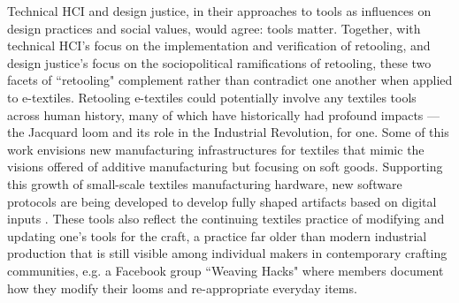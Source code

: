 Technical HCI and design justice, in their approaches to tools as influences on design practices and social values, would agree: tools matter. Together, with technical HCI's focus on the implementation and verification of retooling, and design justice's focus on the sociopolitical ramifications of retooling, these two facets of ``retooling" complement rather than contradict one another when applied to e-textiles. Retooling e-textiles could potentially involve any textiles tools across human history, many of which have historically had profound impacts --- the Jacquard loom and its role in the Industrial Revolution, for one. Some of this work envisions new manufacturing infrastructures for textiles that mimic the visions offered of additive manufacturing but focusing on soft goods. 
Supporting this growth of small-scale textiles manufacturing hardware, new software protocols are being developed to develop fully shaped artifacts based on digital inputs \todo{[5,92]}. These tools also reflect the continuing textiles practice of modifying and updating one's tools for the craft, a practice far older than modern industrial production that is still visible among individual makers in contemporary crafting communities, e.g. a Facebook group ``Weaving Hacks" \todo{[46]} where members document how they modify their looms and re-appropriate everyday items.


